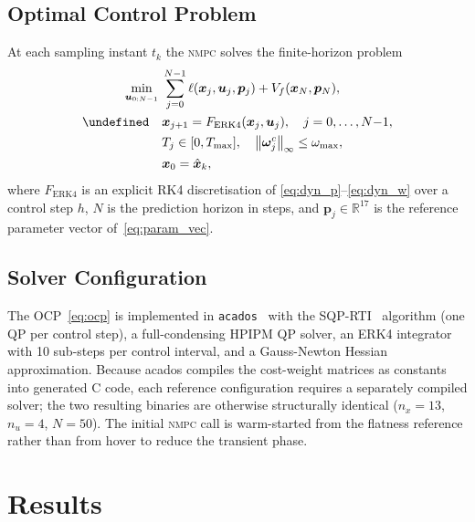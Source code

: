 \documentclass{ieeeaccess}
\let\st\undefined %
\newcommand{\R}{\mathbb{R}}
\newcommand{\norm}[1]{\left\| #1 \right\|}
\newcommand{\vect}[1]{\bm{#1}}
\newcommand{\st}{\text{s.t.}}
\newcommand{\nmpc}{\textsc{nmpc}}
\begin{document}
\subsection{Optimal Control Problem}
\label{sec:ocp}

At each sampling instant $t_k$ the \nmpc{} solves the finite-horizon
problem
%
\begin{subequations}
\label{eq:ocp}
\begin{align}
  \min_{\vect{u}_{0:N-1}}\;&
     \sum_{j=0}^{N-1}\ell(\vect{x}_j,\vect{u}_j,\vect{p}_j)
     + V_f(\vect{x}_N,\vect{p}_N), \label{eq:ocp_cost}\\
  \st\quad & \vect{x}_{j+1}=F_\text{ERK4}(\vect{x}_j,\vect{u}_j),
     \quad j=0,\ldots,N{-}1, \label{eq:ocp_dyn}\\
  & T_j\in[0,T_{\max}],\quad
    \norm{\vect{\omega}_j^c}_\infty\leq\omega_{\max}, \label{eq:ocp_input}\\
  & \vect{x}_0=\hat{\vect{x}}_k, \label{eq:ocp_ic}
\end{align}
\end{subequations}
where $F_\text{ERK4}$ is an explicit RK4 discretisation of
\eqref{eq:dyn_p}--\eqref{eq:dyn_w} over a control step $h$, $N$ is the
prediction horizon in steps, and $\vect{p}_j\in\R^{17}$ is the reference
parameter vector of~\eqref{eq:param_vec}.

\subsection{Solver Configuration}
\label{sec:solver}

The OCP~\eqref{eq:ocp} is implemented in
\texttt{acados}~\cite{verschueren2022acados} with the
SQP-RTI~\cite{diehl2005real} algorithm (one QP per control step), a
full-condensing HPIPM QP solver, an ERK4 integrator with 10 sub-steps
per control interval, and a Gauss-Newton Hessian approximation.
Because acados compiles the cost-weight matrices as constants into
generated C code, each reference configuration requires a separately
compiled solver; the two resulting binaries are otherwise structurally
identical ($n_x=13$, $n_u=4$, $N=50$).
The initial \nmpc{} call is warm-started from the flatness reference
rather than from hover to reduce the transient phase.

\section{Results}
\label{sec:results}
\end{document}
